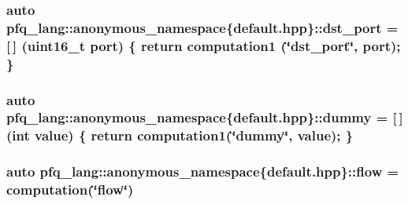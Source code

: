 \hypertarget{namespacepfq__lang_1_1anonymous__namespace_02default_8hpp_03_aceccbe6ec912638fb8d5d3d9e0372a09}{
\subsubsection[{dst\-\_\-port}]{\setlength{\rightskip}{0pt plus 5cm}auto pfq\-\_\-lang\-::anonymous\-\_\-namespace\{default.\-hpp\}\-::dst\-\_\-port = \mbox{[}$\,$\mbox{]} (uint16\-\_\-t {\bf port}) \{ return {\bf computation1} (\char`\"{}dst\-\_\-port\char`\"{}, port); \}}}\label{namespacepfq__lang_1_1anonymous__namespace_02default_8hpp_03_aceccbe6ec912638fb8d5d3d9e0372a09}
\hypertarget{namespacepfq__lang_1_1anonymous__namespace_02default_8hpp_03_a876b4be1c6cf97e317f74242d8fb3da4}{
\subsubsection[{dummy}]{\setlength{\rightskip}{0pt plus 5cm}auto pfq\-\_\-lang\-::anonymous\-\_\-namespace\{default.\-hpp\}\-::dummy = \mbox{[}$\,$\mbox{]} (int value) \{ return {\bf computation1}(\char`\"{}dummy\char`\"{}, value); \}}}\label{namespacepfq__lang_1_1anonymous__namespace_02default_8hpp_03_a876b4be1c6cf97e317f74242d8fb3da4}
\hypertarget{namespacepfq__lang_1_1anonymous__namespace_02default_8hpp_03_a90497b962aed613834286418cd7ea722}{
\subsubsection[{flow}]{\setlength{\rightskip}{0pt plus 5cm}auto pfq\-\_\-lang\-::anonymous\-\_\-namespace\{default.\-hpp\}\-::flow = {\bf computation}(\char`\"{}flow\char`\"{})}}\label{namespacepfq__lang_1_1anonymous__namespace_02default_8hpp_03_a90497b962aed613834286418cd7ea722}
